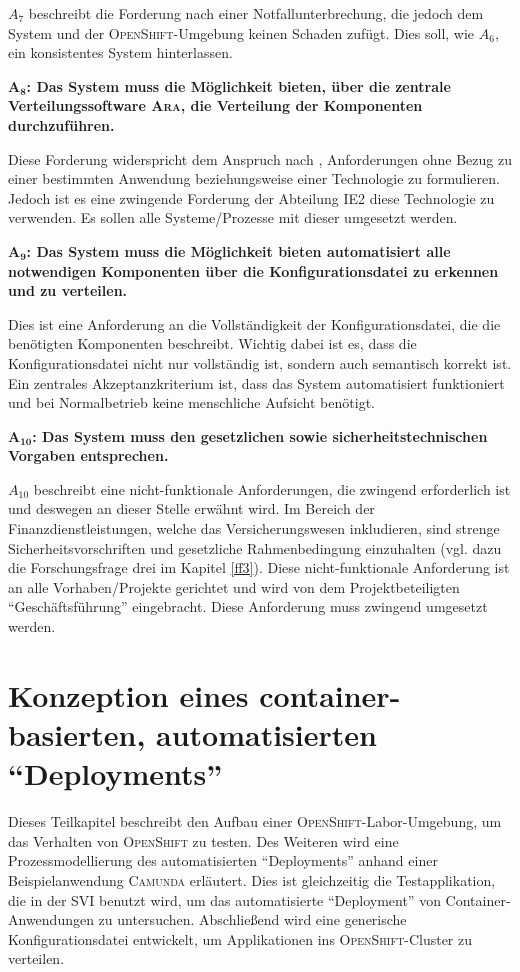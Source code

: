 $A_{7}$ beschreibt die Forderung nach einer Notfallunterbrechung, die jedoch dem System und der \textsc{OpenShift}-Umgebung keinen Schaden zufügt. Dies soll, wie $A_{6}$, ein konsistentes System hinterlassen. 
\par
$\mathbf{A_{8}}$\textbf{: Das System muss die Möglichkeit bieten, über die zentrale Verteilungssoftware \textsc{Ara}, die Verteilung der Komponenten durchzuführen.}
\par
Diese Forderung widerspricht dem Anspruch nach \cite{hull_requirements_2011}, Anforderungen ohne Bezug zu einer bestimmten Anwendung beziehungsweise einer Technologie zu formulieren. Jedoch ist es eine zwingende Forderung der Abteilung \ac{IE2} diese Technologie zu verwenden. Es sollen alle Systeme/Prozesse mit dieser umgesetzt werden.
\par
$\mathbf{A_{9}}$\textbf{: Das System muss die Möglichkeit bieten automatisiert alle notwendigen Komponenten über die Konfigurationsdatei zu erkennen und zu verteilen.}
\par
Dies ist eine Anforderung an die Vollständigkeit der Konfigurationsdatei, die die benötigten Komponenten beschreibt. Wichtig dabei ist es, dass die Konfigurationsdatei nicht nur vollständig ist, sondern auch semantisch korrekt ist. Ein zentrales Akzeptanzkriterium ist, dass das System automatisiert funktioniert und bei Normalbetrieb keine menschliche Aufsicht benötigt.
\par
$\mathbf{A_{10}}$\textbf{: Das System muss den gesetzlichen sowie sicherheitstechnischen Vorgaben entsprechen.}
\par
$A_{10}$ beschreibt eine nicht-funktionale Anforderungen, die zwingend erforderlich ist und deswegen an dieser Stelle erwähnt wird. Im Bereich der Finanzdienstleistungen, welche das Versicherungswesen inkludieren, sind strenge Sicherheitsvorschriften und gesetzliche Rahmenbedingung einzuhalten (vgl. dazu die Forschungsfrage drei im Kapitel \vref{ff3}). Diese nicht-funktionale Anforderung ist an alle Vorhaben/Projekte gerichtet und wird von dem Projektbeteiligten \enquote{Geschäftsführung} eingebracht. Diese Anforderung muss zwingend umgesetzt werden. 

\section{Konzeption eines container-basierten, automatisierten \enquote{Deployments}}
Dieses Teilkapitel beschreibt den Aufbau einer \textsc{OpenShift}-Labor-Umgebung, um das Verhalten von \textsc{OpenShift} zu testen. Des Weiteren wird eine Prozessmodellierung des automatisierten \enquote{Deployments} anhand einer Beispielanwendung \textsc{Camunda} erläutert. Dies ist gleichzeitig die Testapplikation, die in der \ac{SVI} benutzt wird, um das automatisierte \enquote{Deployment} von Container-Anwendungen zu untersuchen. Abschließend wird eine generische Konfigurationsdatei entwickelt, um Applikationen ins \textsc{OpenShift}-Cluster zu verteilen.

